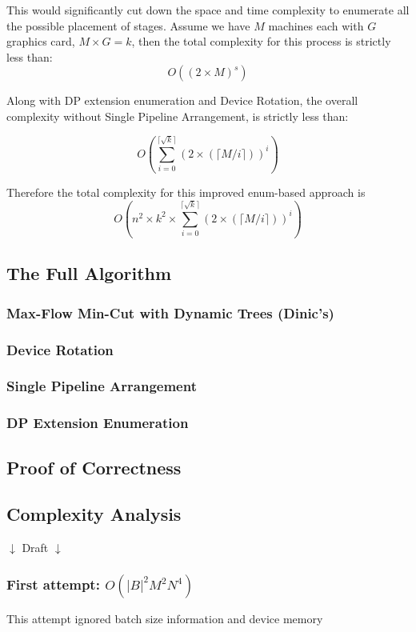 \documentclass[12pt,letterpaper]{article}
\begin{document}
This would significantly cut down the space and time complexity to enumerate all the possible placement of stages. Assume we have $M$ machines each with $G$ graphics card, $M \times G = k$, then the total complexity for this process is strictly less than:
$$O((2\times M)^s)$$

Along with DP extension enumeration and Device Rotation, the overall complexity without Single Pipeline Arrangement, is strictly less than:

$$O(\sum_{i=0}^{\lceil \sqrt{k} \rceil} (2 \times (\lceil M/i \rceil))^i)$$

Therefore the total complexity for this improved enum-based approach is
$$O(n^2 \times k^2 \times \sum_{i=0}^{\lceil \sqrt{k} \rceil} (2 \times (\lceil M/i \rceil))^i)$$

\subsection {The Full Algorithm}
\subsubsection{Max-Flow Min-Cut with Dynamic Trees (Dinic's)}

\subsubsection{Device Rotation}

\subsubsection{Single Pipeline Arrangement}

\subsubsection{DP Extension Enumeration}

\subsection {Proof of Correctness}

\subsection {Complexity Analysis}

$\downarrow$ Draft $\downarrow$
\subsubsection* {First attempt: 
$O(|B|^2M^2N^4)$}
This attempt ignored batch size information and device memory
\end{document}
